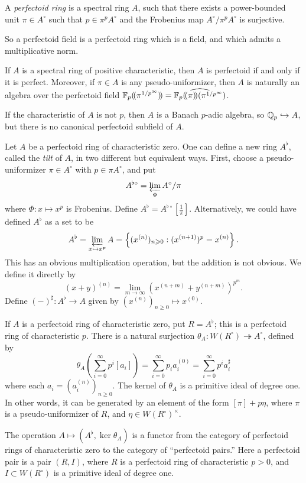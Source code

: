\begin{definition}
A \emph{perfectoid ring} is a spectral ring $A$, such that there exists a 
power-bounded unit $\pi\in A^\circ$ such that $p\in \pi^p A^\circ$ and the 
Frobenius map $A^\circ/\pi^p A^\circ$ is surjective. 
\end{definition}

So a perfectoid field is a perfectoid ring which is a field, and which admits a multiplicative norm. 

If $A$ is a spectral ring of positive characteristic, then $A$ is perfectoid 
if and only if it is perfect. Moreover, if $\pi\in A$ is any 
pseudo-uniformizer, then $A$ is naturally an algebra over the perfectoid field 
$\mathbb{F}_p(\!( {\pi^{1/p^\infty}} )\!) = \widehat{\mathbb{F}_p(\!( {\pi} )\!) (\pi^{1/p^\infty})}$. 

If the characteristic of $A$ is not $p$, then $A$ is a Banach $p$-adic algebra, 
so $\mathbb{Q}_p\hookrightarrow A$, but there is no canonical perfectoid subfield of 
$A$. 

Let $A$ be a perfectoid ring of characteristic zero. One can define a new ring 
$A^\flat$, called the \emph{tilt} of $A$, in two different but equivalent ways. 
First, choose a pseudo-uniformizer $\pi\in A^\circ$ with $p\in \pi A^\circ$, 
and put 
\[
  A^{\flat\circ} = \varprojlim_\Phi A^\circ/\pi
\]
where $\Phi:x\mapsto x^p$ is Frobenius. Define 
$A^\flat=A^{\flat\circ}[\frac 1 \pi]$. Alternatively, we could have defined 
$A^\flat$ as a set to be  
\[
  A^\flat = \varprojlim_{x\mapsto x^p} A = \left\{(x^{(n)})_{n\geqslant 0}:(x^{(n+1)})^p = x^{(n)}\right\} .
\]
This has an obvious multiplication operation, but the addition is not obvious. 
We define it directly by 
\[
  (x+y)^{(n)} = \lim_{m\to \infty} (x^{(n+m)} + y^{(n+m)})^{p^m} .
\]
Define $(-)^\sharp:A^\flat \to A$ given by 
$(x^{(n)})_{n\geqslant 0} \mapsto x^{(0)}$. 

If $A$ is a perfectoid ring of characteristic zero, put $R=A^\flat$; this is 
a perfectoid ring of characteristic $p$. There is a natural surjection 
$\theta_A:W(R^\circ) \twoheadrightarrow A^\circ$, defined by 
\[
  \theta_A\left(\sum_{i=0}^\infty p^i [a_i]\right) = \sum_{i=0}^\infty p_i a_i^{(0)} = \sum_{i=0}^\infty p^i a_i^\sharp
\]
where each $a_i=(a_i^{(n)})_{n\geqslant 0}$. The kernel of 
$\theta_A$ is a primitive ideal of degree one. In other words, it can be 
generated by an element of the form $[\pi]+p\eta$, where $\pi$ is a 
pseudo-uniformizer of $R$, and $\eta\in W(R^\circ)^\times$. 

The operation $A\mapsto (A^\flat, \ker\theta_A)$ is a functor from the category 
of perfectoid rings of characteristic zero to the category of ``perfectoid 
pairs.'' Here a perfectoid pair is a pair $(R,I)$, where $R$ is a perfectoid 
ring of characteristic $p>0$, and $I\subset W(R^\circ)$ is a primitive ideal 
of degree one. 


